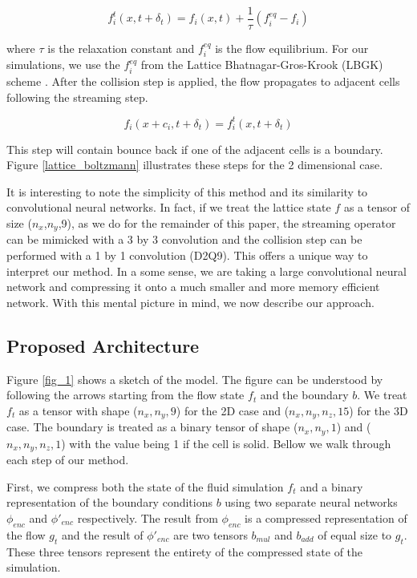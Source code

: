 \documentclass{article}
\begin{document}
\begin{equation}
  f^t_i(x, t + \delta_t) = f_i(x,t) + \frac{1}{\tau} (f_i^{eq} - f_i)
\end{equation}

where $\tau$ is the relaxation constant and $f_i^{eq}$ is the flow equilibrium. For our simulations, we use the $f_i^{eq}$ from the Lattice Bhatnagar-Gros-Krook (LBGK) scheme \cite{guo2013lattice}. After the collision step is applied, the flow propagates to adjacent cells following the streaming step. 

\begin{equation}
  f_i(x + c_i, t + \delta_t) = f^t_i(x,t + \delta_t)
\end{equation}

This step will contain bounce back if one of the adjacent cells is a boundary. Figure \ref{lattice_boltzmann} illustrates these steps for the 2 dimensional case.

It is interesting to note the simplicity of this method and its similarity to convolutional neural networks. In fact, if we treat the lattice state $f$ as a tensor of size ($n_x$,$n_y$,9), as we do for the remainder of this paper, the streaming operator can be mimicked with a 3 by 3 convolution and the collision step can be performed with a 1 by 1 convolution (D2Q9). This offers a unique way to interpret our method. In a some sense, we are taking a large convolutional neural network and compressing it onto a much smaller and more memory efficient network. With this mental picture in mind, we now describe our approach.

\subsection{Proposed Architecture}

Figure \ref{fig_1} shows a sketch of the model. The figure can be understood by following the arrows starting from the flow state $f_t$ and the boundary $b$. We treat $f_t$ as a tensor with shape ($n_x,n_y,9$) for the 2D case and ($n_x,n_y,n_z,15$) for the 3D case. The boundary is treated as a binary tensor of shape ($n_x,n_y,1$) and ($n_x,n_y,n_z,1$) with the value being 1 if the cell is solid. Bellow we walk through each step of our method.

First, we compress both the state of the fluid simulation $f_t$ and a binary representation of the boundary conditions $b$ using two separate neural networks $\phi_{enc}$ and $\phi'_{enc}$ respectively. The result from $\phi_{enc}$ is a compressed representation of the flow $g_t$ and the result of $\phi'_{enc}$ are two tensors $b_{mul}$ and $b_{add}$ of equal size to $g_t$. These three tensors represent the entirety of the compressed state of the simulation.
\end{document}
